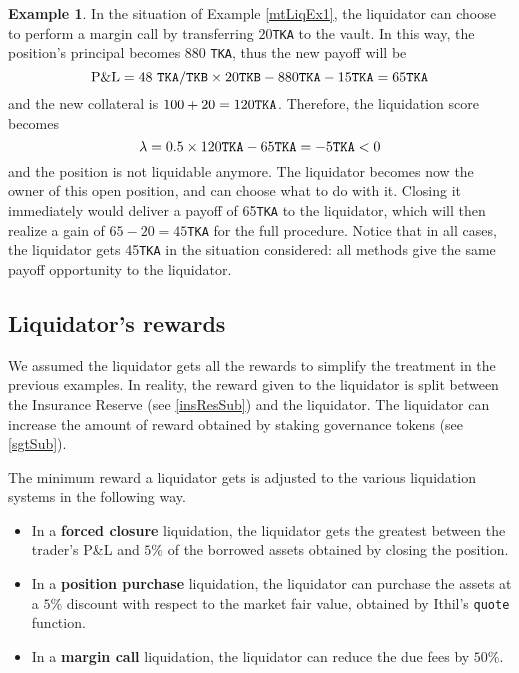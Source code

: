 \documentclass[a4paper,10 pt]{article}
\theoremstyle{definition}
\newtheorem{example}{Example}
\begin{document}
\begin{example}\label{mtLiqEx3}
In the situation of Example \ref{mtLiqEx1}, the liquidator can choose to perform a margin call by transferring $20$\verb|TKA| to the vault. In this way, the position's principal becomes $880$ \verb|TKA|, thus the new payoff will be $$\text{P\&L} =  48\ \verb|TKA|/\verb|TKB| \times 20  \verb|TKB| -  880 \verb|TKA| - 15\verb|TKA|= 65  \verb|TKA| $$
and the new collateral is $100 + 20 = 120 \verb|TKA|$. Therefore, the liquidation score becomes $$\lambda = 0.5\times 120\verb|TKA| - 65\verb|TKA| = -5\verb|TKA| < 0 $$
and the position is not liquidable anymore. The liquidator becomes now the owner of this open position, and can choose what to do with it. Closing it immediately would deliver a payoff of 65\verb|TKA| to the liquidator, which will then realize a gain of $65-20 = 45$\verb|TKA| for the full procedure. Notice that in all cases, the liquidator gets 45\verb|TKA| in the situation considered: all methods give the same payoff opportunity to the liquidator.
\end{example}

\subsection{Liquidator's rewards}\label{liqrewSub}

 We assumed the liquidator gets all the rewards to simplify the treatment in the previous examples. In reality, the reward given to the liquidator is split between the Insurance Reserve (see \ref{insResSub}) and the liquidator. The liquidator can increase the amount of reward obtained by staking governance tokens (see \ref{sgtSub}).

The minimum reward a liquidator gets is adjusted to the various liquidation systems in the following way.

\begin{itemize}
\item In a {\bf forced closure} liquidation, the liquidator gets the greatest between the trader's P\&L and $5\%$ of the borrowed assets obtained by closing the position.
\item In a {\bf position purchase} liquidation, the liquidator can purchase the assets at a $5\%$ discount with respect to the market fair value, obtained by Ithil's \verb|quote| function.
\item In a {\bf margin call} liquidation, the liquidator can reduce the due fees by $50\%$.
\end{itemize}
\end{document}

